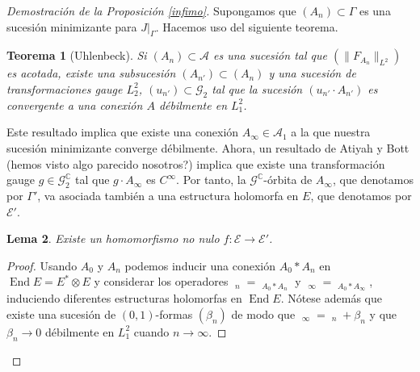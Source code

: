 \documentclass[12pt, a4paper]{amsart}
\newcommand\CC{\mathbb{C}}
\newcommand\Aa{\mathcal{A}}
\newcommand\GG{\mathcal{G}}
\newcommand\EE{\mathscr{E}}
\DeclareMathOperator\End{End}
\DeclareMathOperator\delbar{\bar{\partial}}
\newtheorem{thm}{Teorema}[section]
\newtheorem{lema}[thm]{Lema}
\theoremstyle{remark} \newtheorem{rmk}[thm]{Observación}
\theoremstyle{remark} \newtheorem{rmks}[thm]{Observaciones}
\theoremstyle{definition} \newtheorem{defn}[thm]{Definición}
\theoremstyle{definition} \newtheorem{ejs}[thm]{Ejemplos}
\theoremstyle{definition} \newtheorem{ej}[thm]{Ejemplo}
\begin{document}
\begin{proof}[Demostración de la Proposición \ref{infimo}]
Supongamos que $(A_n)\subset \Gamma$ es una sucesión minimizante para $J|_{\Gamma}$. Hacemos uso del siguiente teorema.

\begin{thm}[Uhlenbeck]
	Si $(A_n)\subset \Aa$ es una sucesión tal que $(\lVert F_{A_n}\rVert_{L^2})$ es acotada, existe una subsucesión $(A_{n'})\subset(A_n)$ y una sucesión de transformaciones gauge $L^2_2$, $(u_{n'})\subset \GG_2$ tal que la sucesión $(u_{n'}\cdot A_{n'})$ es convergente a una conexión $A$ débilmente en $L^2_1$.
\end{thm}

Este resultado implica que existe una conexión $A_\infty \in \Aa_1$ a la que nuestra sucesión minimizante converge débilmente. Ahora, un resultado de Atiyah y Bott (hemos visto algo parecido nosotros?) implica que existe una transformación gauge $g\in \GG_2^\CC$ tal que $g\cdot A_\infty$ es $C^\infty$. Por tanto, la $\GG^\CC$-órbita de $A_\infty$, que denotamos por $\Gamma'$, va asociada también a una estructura holomorfa en $E$, que denotamos por $\EE'$.

\begin{lema}
Existe un homomorfismo no nulo $f:\EE\rightarrow \EE'$.	
\end{lema}
\begin{proof}
	Usando $A_0$ y $A_n$ podemos inducir una conexión $A_0*A_n$ en $\End E=E^*\otimes E$ y considerar los operadores $\delbar_{n}=\delbar_{A_0*A_n}$ y $\delbar_\infty=\delbar_{A_0*A_\infty}$, induciendo diferentes estructuras holomorfas en $\End E$. Nótese además que existe una sucesión de $(0,1)$-formas  $(\beta_n)$ de modo que $\delbar_\infty=\delbar_n + \beta_n$ y que $\beta_n \rightarrow 0$ débilmente en  $L^2_1$ cuando $n\rightarrow \infty$.	


\end{proof}
\end{proof}
\end{document}
